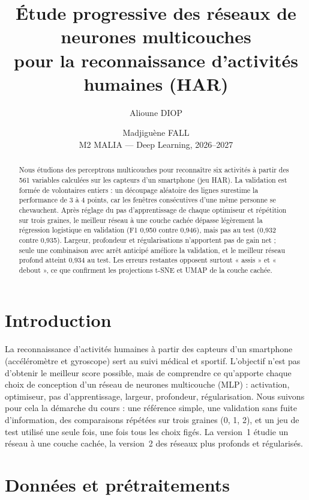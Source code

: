 \documentclass[10pt,a4paper]{article}
\title{Étude progressive des réseaux de neurones multicouches\\pour la reconnaissance d'activités humaines (HAR)}
\author{Alioune DIOP \and Madjiguène FALL\\M2 MALIA --- Deep Learning, 2026--2027}
\date{}
\begin{document}
\maketitle


\begin{abstract}
Nous étudions des perceptrons multicouches pour reconnaître six activités à partir des 561 variables calculées sur
les capteurs d'un smartphone (jeu HAR). La validation est formée de volontaires entiers : un découpage aléatoire des
lignes surestime la performance de 3 à 4 points, car les fenêtres consécutives d'une même personne se chevauchent.
Après réglage du pas d'apprentissage de chaque optimiseur et répétition sur trois graines, le meilleur réseau à une
couche cachée dépasse légèrement la régression logistique en validation (F1 0,950 contre 0,946), mais pas au test
(0,932 contre 0,935). Largeur, profondeur et régularisations n'apportent pas de gain net ; seule une combinaison avec
arrêt anticipé améliore la validation, et le meilleur réseau profond atteint 0,934 au test. Les erreurs restantes
opposent surtout « assis » et « debout », ce que confirment les projections t-SNE et UMAP de la couche cachée.
\end{abstract}

\section{Introduction}               %
La reconnaissance d'activités humaines à partir des capteurs d'un smartphone (accéléromètre et gyroscope) sert au suivi
médical et sportif. L'objectif n'est pas d'obtenir le meilleur score possible, mais de comprendre ce qu'apporte chaque
choix de conception d'un réseau de neurones multicouche (MLP) : activation, optimiseur, pas d'apprentissage, largeur,
profondeur, régularisation. Nous suivons pour cela la démarche du cours : une référence simple, une validation sans
fuite d'information, des comparaisons répétées sur trois graines (0, 1, 2), et un jeu de test utilisé une seule fois,
une fois tous les choix figés. La version~1 étudie un réseau à une couche cachée, la version~2 des réseaux plus
profonds et régularisés.

\section{Données et prétraitements}  %
\end{document}
